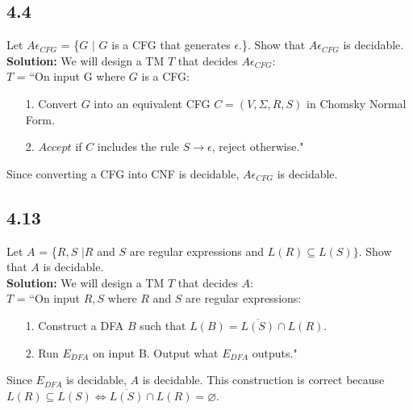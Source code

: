 \subsection*{4.4} Let $A\epsilon_{CFG}$ = \{\textlangle{}$G$\textrangle{} $|$ $G$ is a CFG that generates $\epsilon$.\}. Show that $A\epsilon_{CFG}$ is decidable.
\\
\textbf{Solution:} We will design a TM $T$ that decides $A\epsilon_{CFG}$:
\\
$T$ = ``On input \textlangle{}G\textrangle{} where $G$ is a CFG:
\begin{enumerate}
\itemsep0em
\item[1.]Convert $G$ into an equivalent CFG $C = (V, \Sigma, R, S)$ in Chomsky Normal Form.
\item[2.]$Accept$ if $C$ includes the rule $S \rightarrow \epsilon$, reject otherwise."
\end{enumerate}
Since converting a CFG into CNF is decidable, $A\epsilon_{CFG}$ is decidable.

\subsection*{4.13} Let $A$ = \{\textlangle{}$R,S$\textrangle{} $| R$ and $S$ are regular expressions and $L(R) \subseteq L(S)\}$. Show that $A$ is decidable.
\\
\textbf{Solution:} We will design a TM $T$ that decides $A$:
\\
$T$ = ``On input \textlangle{}$R,S$\textrangle{} where $R$ and $S$ are regular expressions:
\begin{enumerate}
\itemsep0em
\item[1.]Construct a DFA $B$ such that $L(B) = \overline{L(S)} \cap L(R)$.
\item[2.]Run $E_{DFA}$ on input \textlangle{}B\textrangle{}. Output what $E_{DFA}$ outputs."
\end{enumerate}
Since $E_{DFA}$ is decidable, $A$ is decidable. This construction is correct because $L(R) \subseteq L(S) \Leftrightarrow \overline{L(S)} \cap L(R) = \varnothing$.

